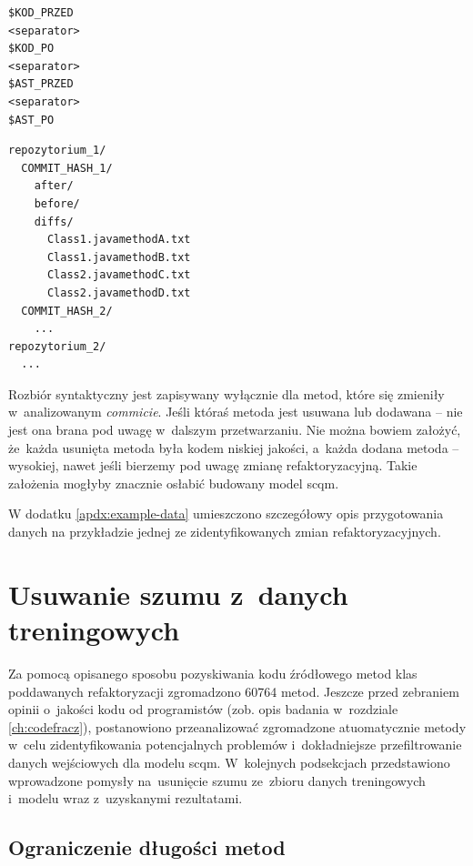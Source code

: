 \documentclass[twoside]{praca}
\begin{document}
\pagebreak

\begin{lstlisting}[frame=single,caption={Struktura pliku przechowującego drzewa \gls{ast} przed i~po refaktoryzacji},captionpos=b,label={lst:impl:ast-file-structure}]
$KOD_PRZED
<separator>
$KOD_PO
<separator>
$AST_PRZED
<separator>
$AST_PO
\end{lstlisting}

\begin{lstlisting}[frame=single,caption={Struktura danych przechowujących rozbiór syntaktyczny metod},captionpos=b,label={lst:impl:commit-file-structure-after-ast}]
repozytorium_1/
  COMMIT_HASH_1/
    after/
    before/
    diffs/
      Class1.javamethodA.txt
      Class1.javamethodB.txt
      Class2.javamethodC.txt
      Class2.javamethodD.txt
  COMMIT_HASH_2/
    ...
repozytorium_2/
  ...
\end{lstlisting}

Rozbiór syntaktyczny jest zapisywany wyłącznie dla metod, które się zmieniły w~analizowanym \textit{commicie}. Jeśli któraś metoda jest usuwana lub dodawana -- nie jest ona brana pod uwagę w~dalszym przetwarzaniu. Nie można bowiem założyć, że~każda usunięta metoda była kodem niskiej jakości, a~każda dodana metoda -- wysokiej, nawet jeśli bierzemy pod uwagę zmianę refaktoryzacyjną. Takie założenia mogłyby znacznie osłabić budowany model \gls{scqm}.

W dodatku \ref{apdx:example-data} umieszczono szczegółowy opis przygotowania danych na przykładzie jednej ze zidentyfikowanych zmian refaktoryzacyjnych.

\section{Usuwanie szumu z~danych treningowych}
\label{sec:learn:better-ideas}

Za pomocą opisanego sposobu pozyskiwania kodu źródłowego metod klas poddawanych refaktoryzacji zgromadzono 60764 metod. Jeszcze przed zebraniem opinii o~jakości kodu od programistów (zob. opis badania w~rozdziale \ref{ch:codefracz}), postanowiono przeanalizować zgromadzone atuomatycznie metody w~celu zidentyfikowania potencjalnych problemów i~dokładniejsze przefiltrowanie danych wejściowych dla modelu \gls{scqm}. W~kolejnych podsekcjach przedstawiono wprowadzone pomysły na~usunięcie szumu ze~zbioru danych treningowych i~modelu wraz z~uzyskanymi rezultatami.

\subsection{Ograniczenie długości metod}
\label{sec:learn:len-limit}
\end{document}
